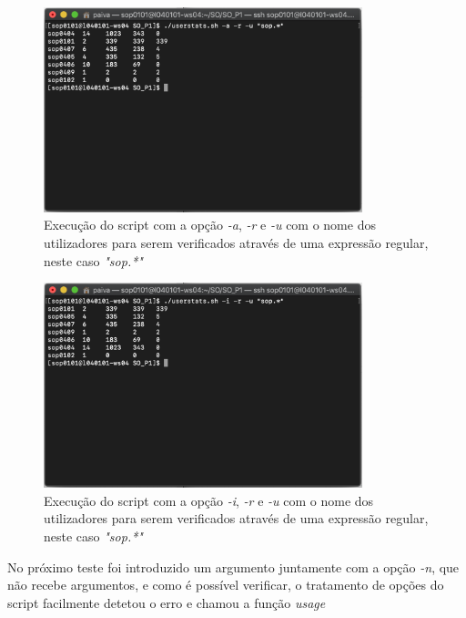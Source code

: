 \documentclass[10pt,portuguese]{article}
\begin{document}
\begin{figure}[!h]
    \centering
    \includegraphics[width=350]{Resultados/-a_-r_-u.png}
    \caption{Execução do script com a opção \textit{-a}, \textit{-r} e \textit{-u} com o nome dos utilizadores para serem verificados através de uma expressão regular, neste caso \textit{"sop.*"}}
\end{figure}

\begin{figure}[!h]
    \centering
    \includegraphics[width=350]{Resultados/-i_-r_-u.png}
    \caption{Execução do script com a opção \textit{-i}, \textit{-r} e \textit{-u} com o nome dos utilizadores para serem verificados através de uma expressão regular, neste caso \textit{"sop.*"}}
\end{figure}
\clearpage

No próximo teste foi introduzido um argumento juntamente com a opção \textit{-n}, que não recebe argumentos, e como é possível verificar, o tratamento de opções do script facilmente detetou o erro e chamou a função \textit{usage}
\end{document}
